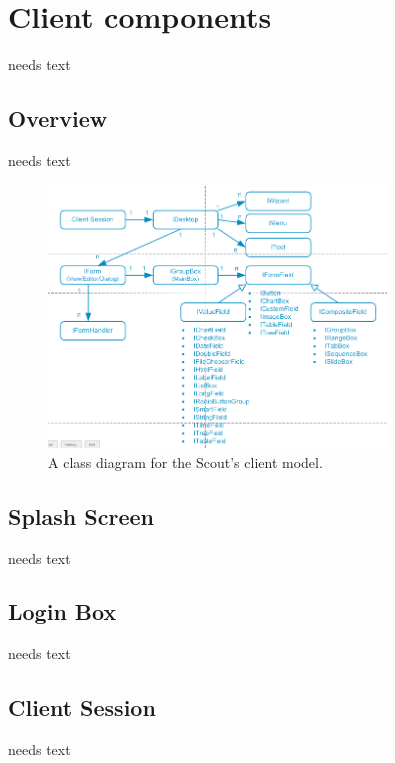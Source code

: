 \documentclass[a4paper,10pt,twoside]{book}
\begin{document}
{%
\chapter{Client components}
needs text

\section{Overview}

needs text
\begin{figure}[!htb]
\centering
\includegraphics[width=0.8\textwidth]{scoutclientmodel.png}
\caption{A class diagram for the Scout's client model.}
\label{fig:scoutclientmodel}
\end{figure}

\section{Splash Screen}
needs text

\section{Login Box}
needs text

\section{Client Session}
needs text

}
\end{document}

